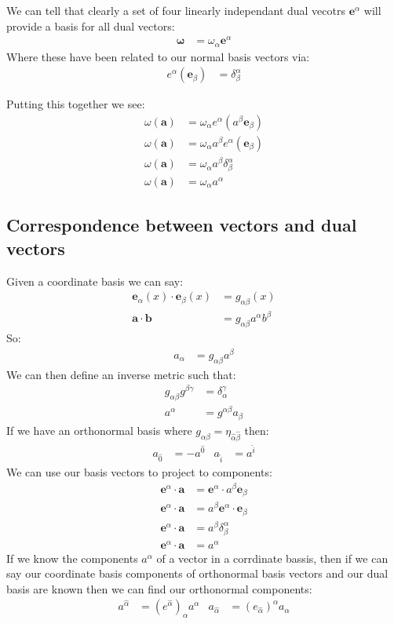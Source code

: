 We can tell that clearly a set of four linearly independant dual vecotrs $\bm{e}^\alpha$ will provide a basis for all dual vectors:
\begin{align*}
	\bm{\omega} &= \omega_\alpha \bm{e}^\alpha
\end{align*}
Where these have been related to our normal basis vectors via:
\begin{align*}
	e^\alpha(\bm{e}_\beta) &= \delta^\alpha_\beta
\end{align*}

Putting this together we see:
\begin{align*}
	\omega(\bm{a}) &= \omega_\alpha e^\alpha(a^\beta\bm{e}_\beta) \\
	\omega(\bm{a}) &= \omega_\alpha a^\beta e^\alpha(\bm{e}_\beta) \\
	\omega(\bm{a}) &= \omega_\alpha a^\beta \delta_\beta^\alpha \\
	\omega(\bm{a}) &= \omega_\alpha a^\alpha
\end{align*}
\subsection{Correspondence between vectors and dual vectors}
Given a coordinate basis we can say:
\begin{align*}
	\bm{e}_\alpha(x)\cdot\bm{e}_\beta(x) &= g_{\alpha\beta}(x) \\
	\bm{a}\cdot\bm{b} &= g_{\alpha\beta} a^\alpha b^\beta
\end{align*}
So:
\begin{align*}
	a_\alpha &= g_{\alpha\beta}a^\beta
\end{align*}
We can then define an inverse metric such that:
\begin{align*}
	g_{\alpha\beta}g^{\beta\gamma} &= \delta_\alpha^\gamma \\
	a^\alpha &= g^{\alpha\beta}a_\beta
\end{align*}
If we have an orthonormal basis where $g_{\alpha\beta} = \eta_{\hat{\alpha}\hat{\beta}}$ then:
\begin{align*}
	a_{\hat{0}} &= - a^{\hat{0}} & a_{\hat{i}} &= a^{\hat{i}}
\end{align*}
We can use our basis vectors to project to components:
\begin{align*}
	\bm{e}^\alpha \cdot \bm{a} &= \bm{e}^\alpha\cdot a^\beta \bm{e}_\beta \\
	\bm{e}^\alpha \cdot \bm{a} &= a^\beta \bm{e}^\alpha\cdot \bm{e}_\beta \\
	\bm{e}^\alpha \cdot \bm{a} &= a^\beta \delta^\alpha_\beta \\
	\bm{e}^\alpha \cdot \bm{a} &= a^\alpha
\end{align*}
If we know the components $a^\alpha$ of a vector in a corrdinate bassis, then if we can say our coordinate basis components of orthonormal basis vectors and our dual basis are known then we can find our orthonormal components:
\begin{align*}
	a^{\hat{\alpha}} &= (e^{\hat{\alpha}})_\alpha a^\alpha & a_{\hat{\alpha}} &= (e_{\hat{\alpha}})^\alpha a_\alpha
\end{align*}

